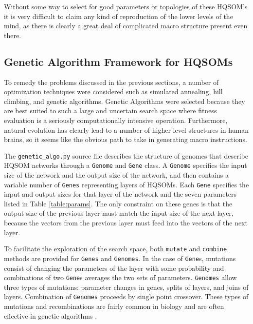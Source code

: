 \documentclass[12pt,a4paper]{article}
\begin{document}
Without some way to select for good parameters or topologies of these HQSOM's it is very difficult to claim any kind of reproduction of the lower levels of the mind, as there is clearly a great deal of complicated macro structure present even there.

\subsection{Genetic Algorithm Framework for HQSOMs}
To remedy the problems discussed in the previous sections, a number of optimization techniques were considered such as simulated annealing, hill climbing, and genetic algorithms.  Genetic Algorithms were selected because they are best suited to such a large and uncertain search space where fitness evaluation is a seriously computationally intensive operation.  Furthermore, natural evolution has clearly lead to a number of higher level structures in human brains, so it seems like the obvious path to take in generating macro instructions.

The \texttt{genetic\_algo.py} source file describes the structure of genomes that describe HQSOM networks through a \texttt{Genome} and \texttt{Gene} class. A \texttt{Genome} specifies the input size of the network and the output size of the network, and then contains a variable number of \texttt{Genes} representing layers of HQSOMs.  Each \texttt{Gene} specifies the input and output sizes for that layer of the network and the seven parameters listed in Table \ref{table:params}. The only constraint on these genes is that the output size of the previous layer must match the input size of the next layer, because the vectors from the previous layer must feed into the vectors of the next layer.

To facilitate the exploration of the search space, both \texttt{mutate} and \texttt{combine} methods are provided for \texttt{Genes} and \texttt{Genomes}.  In the case of \texttt{Gene}s, mutations consist of changing the parameters of the layer with some probability and combinations of two \texttt{Gene}s averages the two sets of parameters.  \texttt{Genomes} allow three types of mutations: parameter changes in genes, splits of layers, and joins of layers.  Combination of \texttt{Genomes} proceeds by single point crossover.  These types of mutations and recombinations are fairly common in biology and are often effective in genetic algorithms \cite{Inspiration}.
\end{document}
